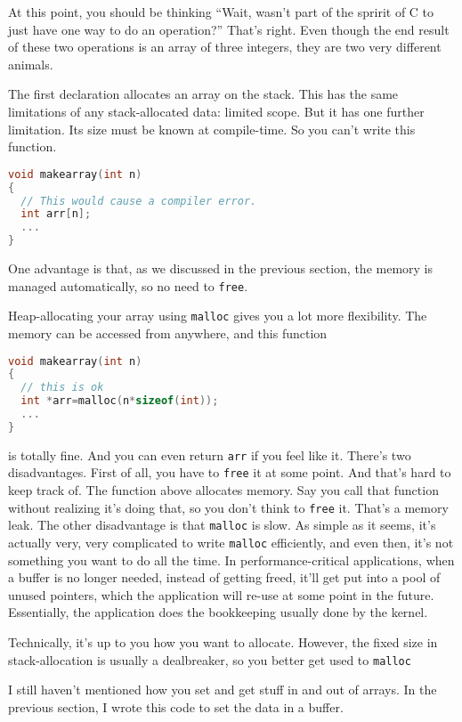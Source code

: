 \documentclass[ebook,11pt,oneside,openany]{memoir}
\begin{document}
At this point, you should be thinking ``Wait, wasn't part of the spririt of C to just have one way to do an operation?'' That's right. Even though the end result of these two operations is an array of three integers, they are two very different animals.

The first declaration allocates an array on the stack. This has the same limitations of any stack-allocated data: limited scope. But it has one further limitation. Its size must be known at compile-time. So you can't write this function. 

\begin{lstlisting}[language=C]
void makearray(int n) 
{
  // This would cause a compiler error.
  int arr[n];
  ...
}
\end{lstlisting}

One advantage is that, as we discussed in the previous section, the memory is managed automatically, so no need to \texttt{free}.

Heap-allocating your array using \texttt{malloc} gives you a lot more flexibility. The memory can be accessed from anywhere, and this function 

\begin{lstlisting}[language=C]
void makearray(int n) 
{
  // this is ok
  int *arr=malloc(n*sizeof(int));
  ...
}
\end{lstlisting}

is totally fine. And you can even return \texttt{arr} if you feel like it. There's two disadvantages. First of all, you have to \texttt{free} it at some point. And that's hard to keep track of. The function above allocates memory. Say you call that function without realizing it's doing that, so you don't think to \texttt{free} it. That's a memory leak. The other disadvantage is that \texttt{malloc} is slow. As simple as it seems, it's actually very, very complicated to write \texttt{malloc} efficiently, and even then, it's not something you want to do all the time. In performance-critical applications, when a buffer is no longer needed, instead of getting freed, it'll get put into a pool of unused pointers, which the application will re-use at some point in the future. Essentially, the application does the bookkeeping usually done by the kernel. 

Technically, it's up to you how you want to allocate. However, the fixed size in stack-allocation is usually a dealbreaker, so you better get used to \texttt{malloc}

I still haven't mentioned how you set and get stuff in and out of arrays. In the previous section, I wrote this code to set the data in a buffer.
\end{document}
